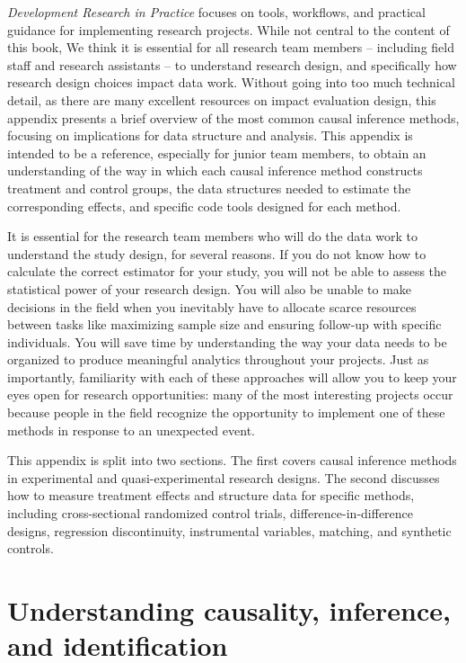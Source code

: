 \documentclass[
]{book}
\begin{document}
\emph{Development Research in Practice} focuses on tools, workflows, and practical
guidance for implementing research projects.
While not central to the content of this book,
We think it is essential for all research team members
-- including field staff and research assistants --
to understand research design,
and specifically how research design choices impact data work.
Without going into too much technical detail,
as there are many excellent resources on impact evaluation design,
this appendix presents a brief overview
of the most common causal inference methods,
focusing on implications for data structure and analysis.
This appendix is intended to be a reference,
especially for junior team members,
to obtain an understanding of the way in which each
causal inference method constructs treatment and control groups,
the data structures needed to estimate the corresponding effects,
and specific code tools designed for each method.

It is essential for the research team members who will do the data work
to understand the study design, for several reasons.
If you do not know how to calculate the correct estimator for your study,
you will not be able to assess the statistical power of your research design.
You will also be unable to make decisions in the field
when you inevitably have to allocate scarce resources
between tasks like maximizing sample size
and ensuring follow-up with specific individuals.
You will save time by understanding the way your data needs to be organized
to produce meaningful analytics throughout your projects.
Just as importantly, familiarity with each of these approaches
will allow you to keep your eyes open for research opportunities:
many of the most interesting projects occur because people in the field
recognize the opportunity to implement one of these methods
in response to an unexpected event.

This appendix is split into two sections.
The first covers causal inference methods
in experimental and quasi-experimental research designs.
The second discusses how to measure treatment effects and structure data for specific methods,
including cross-sectional randomized control trials, difference-in-difference designs,
regression discontinuity, instrumental variables, matching, and synthetic controls.

\hypertarget{understanding-causality-inference-and-identification}{%
\section*{Understanding causality, inference, and identification}\label{understanding-causality-inference-and-identification}}
\end{document}
